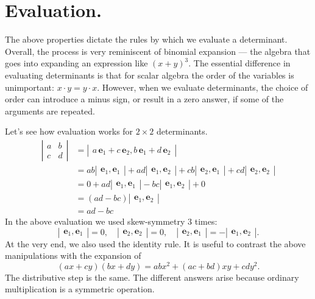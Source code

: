 \documentclass[12pt]{article}
\newcommand{\be}{\mathbf{e}}
\newcommand{\vmat}[1]{\left|\begin{matrix}#1\end{matrix}\right|}
\begin{document}
\section{Evaluation.}  The above properties dictate the rules by
which we evaluate a determinant.  Overall, the process is very
reminiscent of binomial expansion --- the algebra that goes into
expanding an expression like $(x+y)^3$.  The essential difference in
evaluating determinants is that for scalar algebra the order of the
variables is unimportant: $x\cdot y = y\cdot x$.  However, when we
evaluate determinants, the choice of order can introduce a minus sign,
or result in a zero answer, if some of the arguments are repeated.

Let's see how evaluation works for $2\times 2$ determinants.
\begin{align*}
    \vmat{ a& b\\c&d} &= \vmat{ a\,\be_1 + c\,\be_2, b\,\be_1 + d\,\be_2}  \\
    &= ab \vmat{ \be_1, \be_1} +  ad \vmat{ \be_1, \be_2} + cb \vmat{
      \be_2, \be_1} + 
    cd \vmat{ \be_2,  \be_2} \\
    &= 0+ad  \vmat{ \be_1, \be_1}  -
    bc \vmat{ \be_1,  \be_2}+0\\
     &= (ad-bc) \vmat{ \be_1, \be_2} \\
     &= ad-bc    
\end{align*}
In the above evaluation we used skew-symmetry 3 times:
\[ \vmat{\be_1,\be_1} = 0,\quad \vmat{\be_2, \be_2} = 0,\quad
\vmat{\be_2,\be_1} = - \vmat{\be_1, \be_2}.\]
At the very end, we also used the identity rule.
It is useful  to contrast the above manipulations with the expansion of
\[ (ax+cy)(bx+dy) = ab x^2 + (ac+bd) xy + cd y^2.\]
The distributive step is the same. The different answers arise because
ordinary multiplication is a symmetric operation.
\end{document}

